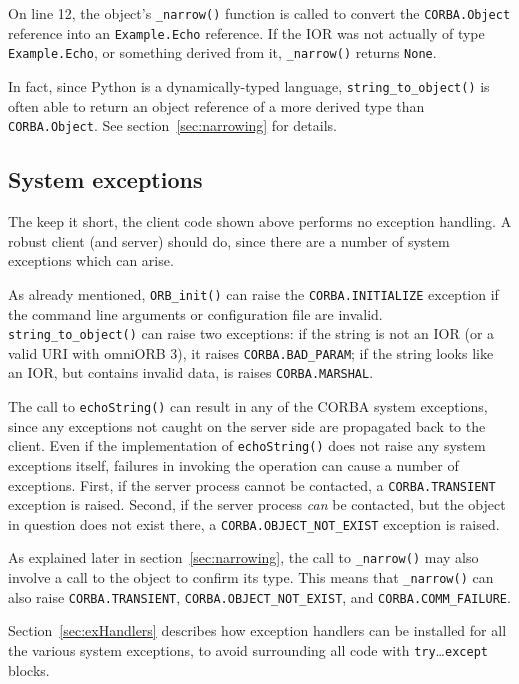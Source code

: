 \documentclass[11pt,twoside,a4paper]{book}
\newcommand{\type}[1]{\texttt{#1}}
\newcommand{\code}[1]{\texttt{#1}}
\newcommand{\op}[1]{\texttt{#1()}}
\newcommand{\dsc}{\discretionary{}{}{}}
\begin{document}
On line 12, the object's \op{\_narrow} function is called to convert
the \type{CORBA.\dsc{}Object} reference into an \type{Example.Echo}
reference. If the IOR was not actually of type \type{Example.Echo}, or
something derived from it, \op{\_narrow} returns \code{None}.

In fact, since Python is a dynamically-typed language,
\op{string\_to\_object} is often able to return an object reference of
a more derived type than \type{CORBA.\dsc{}Object}. See
section~\ref{sec:narrowing} for details.

\vspace{\baselineskip}%


\subsection{System exceptions}

The keep it short, the client code shown above performs no exception
handling. A robust client (and server) should do, since there are a
number of system exceptions which can arise.

As already mentioned, \op{ORB\_init} can raise the
\code{CORBA.INITIALIZE} exception if the command line arguments or
configuration file are invalid.  \op{string\_to\_\dsc{}object} can
raise two exceptions: if the string is not an IOR (or a valid URI with
omniORB 3), it raises \code{CORBA.BAD\_PARAM}; if the string looks
like an IOR, but contains invalid data, is raises
\code{CORBA.MARSHAL}.

The call to \op{echoString} can result in any of the CORBA system
exceptions, since any exceptions not caught on the server side are
propagated back to the client. Even if the implementation of
\op{echoString} does not raise any system exceptions itself, failures
in invoking the operation can cause a number of exceptions. First, if
the server process cannot be contacted, a \code{CORBA.TRANSIENT}
exception is raised. Second, if the server process \emph{can} be
contacted, but the object in question does not exist there, a
\code{CORBA.OBJECT\_NOT\_EXIST} exception is raised.

As explained later in section~\ref{sec:narrowing}, the call to
\op{\_narrow} may also involve a call to the object to confirm its
type. This means that \op{\_narrow} can also raise
\code{CORBA.TRANSIENT}, \code{CORBA.OBJECT\_NOT\_EXIST}, and
\code{CORBA.COMM\_FAILURE}.

Section~\ref{sec:exHandlers} describes how exception handlers can be
installed for all the various system exceptions, to avoid surrounding
all code with \code{try}\dots\code{except} blocks.
\end{document}
